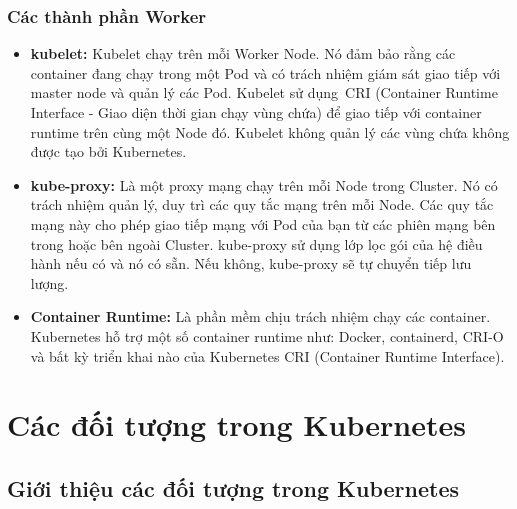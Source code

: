 \documentclass[12pt,a4paper]{report}
\begin{document}
	\subsubsection{Các thành phần Worker}
	
	\hspace{1cm}{Có nhiệm vụ xử lý khối lượng công việc của application trong cluster, duy trì các nhóm đang chạy và cung cấp môi trường runtime cho Kubernetes. Worker sẽ bao gồm 3 thành phần chính sau:}
	\begin{itemize}
		\item \textbf{kubelet:}
		\smallskip
		\subitem
		Kubelet chạy trên mỗi Worker Node. Nó đảm bảo rằng các container đang chạy trong một Pod và có trách nhiệm giám sát giao tiếp với master node và quản lý các Pod. Kubelet sử dụng CRI (Container Runtime Interface - Giao diện thời gian chạy vùng chứa) để giao tiếp với container runtime trên cùng một Node đó. Kubelet không quản lý các vùng chứa không được tạo bởi Kubernetes.
		
		\item \textbf{kube-proxy:}
		\smallskip
		\subitem
		Là một proxy mạng chạy trên mỗi Node trong Cluster. Nó có trách nhiệm quản lý, duy trì các quy tắc mạng trên mỗi Node. Các quy tắc mạng này cho phép giao tiếp mạng với Pod của bạn từ các phiên mạng bên trong hoặc bên ngoài Cluster. kube-proxy sử dụng lớp lọc gói của hệ điều hành nếu có và nó có sẵn. Nếu không, kube-proxy sẽ tự chuyển tiếp lưu lượng.
		
		\item \textbf{Container Runtime:}
		\smallskip
		\subitem
		Là phần mềm chịu trách nhiệm chạy các container. Kubernetes hỗ trợ một số container runtime như: Docker, containerd, CRI-O và bất kỳ triển khai nào của Kubernetes CRI (Container Runtime Interface).
	\end{itemize}
	
	\section{Các đối tượng trong Kubernetes}
	
	\subsection{Giới thiệu các đối tượng trong Kubernetes}
	
\end{document}
